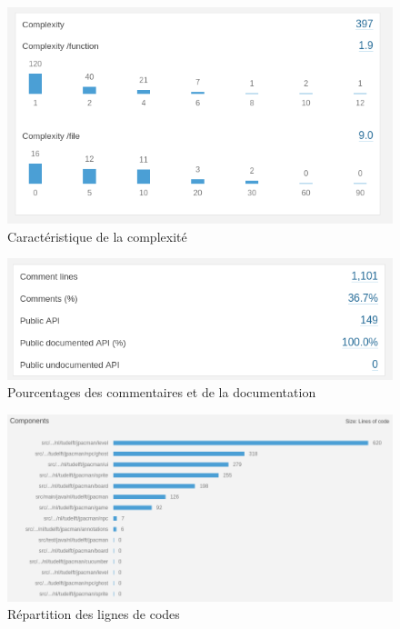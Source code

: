 \documentclass[12pt, openany]{report}
\begin{document}
\begin{figure}[!h]
	\centering
	\includegraphics[scale=0.5]{Images/sonarInitial2.png} 
	\caption{Caractéristique de la complexité}
	\label{sonarInitial2}
\end{figure} 

\begin{figure}[!h]
	\centering
	\includegraphics[scale=0.5]{Images/sonarInitial3.png} 
	\caption{Pourcentages des commentaires et de la documentation}
	\label{sonarInitial3}
\end{figure} 

\begin{figure}[!h]
	\centering
	\includegraphics[scale=0.5]{Images/sonarInitial4.png} 
	\caption{Répartition des lignes de codes}
	\label{sonarInitial4}
\end{figure} 
\end{document}
